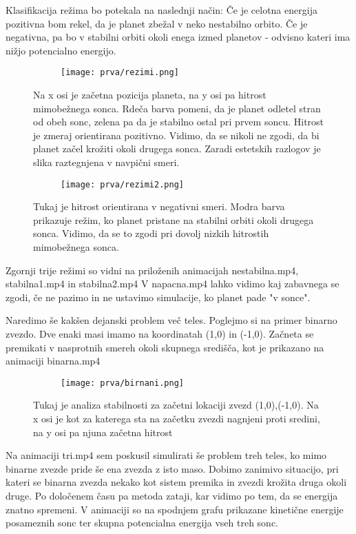 \documentclass{article}
\begin{document}
Klasifikacija režima bo potekala na naslednji način: Če je celotna energija pozitivna bom rekel, da je planet zbežal v neko nestabilno orbito. Če je negativna, pa bo v stabilni orbiti okoli enega izmed planetov - odvisno kateri ima nižjo potencialno energijo.

\begin{figure}[H]
\centering
\begin{subfigure}{.7\textwidth}
\texttt{[image: prva/rezimi.png]}
\end{subfigure}
\caption*{Na x osi je začetna pozicija planeta, na y osi pa hitrost mimobežnega sonca. Rdeča barva pomeni, da je planet odletel stran od obeh sonc, zelena pa da je stabilno ostal pri prvem soncu. Hitrost je zmeraj orientirana pozitivno. Vidimo, da se nikoli ne zgodi, da bi planet začel krožiti okoli drugega sonca. Zaradi estetskih razlogov je slika raztegnjena v navpični smeri.}
\end{figure}

\begin{figure}[H]
\centering
\begin{subfigure}{.7\textwidth}
\texttt{[image: prva/rezimi2.png]}
\end{subfigure}
\caption*{Tukaj je hitrost orientirana v negativni smeri. Modra barva prikazuje režim, ko planet pristane na stabilni orbiti okoli drugega sonca. Vidimo, da se to zgodi pri dovolj nizkih hitrostih mimobežnega sonca.}
\end{figure}



Zgornji trije režimi so vidni na priloženih animacijah nestabilna.mp4, stabilna1.mp4 in stabilna2.mp4
V napacna.mp4 lahko vidimo kaj zabavnega se zgodi, če ne pazimo in ne ustavimo simulacije, ko planet pade "v sonce".

Naredimo še kakšen dejanski problem več teles. Poglejmo si na primer binarno zvezdo.
Dve enaki masi imamo na koordinatah (1,0) in (-1,0). Začneta se premikati v nasprotnih smereh okoli skupnega središča, kot je prikazano na animaciji binarna.mp4

\begin{figure}[H]
\centering
\begin{subfigure}{.7\textwidth}
\texttt{[image: prva/birnani.png]}
\end{subfigure}
\caption*{Tukaj je analiza stabilnosti za začetni lokaciji zvezd (1,0),(-1,0). Na x osi je kot za katerega sta na začetku zvezdi nagnjeni proti sredini, na y osi pa njuna začetna hitrost}
\end{figure}

Na animaciji tri.mp4 sem poskusil simulirati še problem treh teles, ko mimo binarne zvezde pride še ena zvezda z isto maso. Dobimo zanimivo situacijo, pri kateri se binarna zvezda nekako kot sistem premika in zvezdi krožita druga okoli druge. Po določenem času pa metoda zataji, kar vidimo po tem, da se energija znatno spremeni. V animaciji so na spodnjem grafu prikazane kinetične energije posameznih sonc ter skupna potencialna energija vseh treh sonc. 
\end{document}
